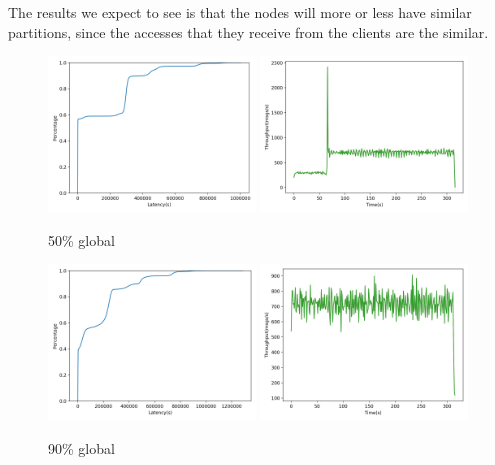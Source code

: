 The results we expect to see is that the nodes will more or less have similar partitions, since the accesses that they receive from the clients are the similar.

\begin{figure}[!htb]
  \centering
  \includegraphics[width=0.49\textwidth,height=\textheight,keepaspectratio]{img/global50_lat.png}
  \includegraphics[width=0.49\textwidth,height=\textheight,keepaspectratio]{img/global50_tp.png}
  \caption{ 50\% global }
  \label{fig:global50-performance}
\end{figure}

\begin{figure}[!htb]
  \centering
  \includegraphics[width=0.49\textwidth,height=\textheight,keepaspectratio]{img/global10_lat.png}
  \includegraphics[width=0.49\textwidth,height=\textheight,keepaspectratio]{img/global10_tp.png}
  \caption{ 90\% global }
  \label{fig:global10-performance}
\end{figure}

